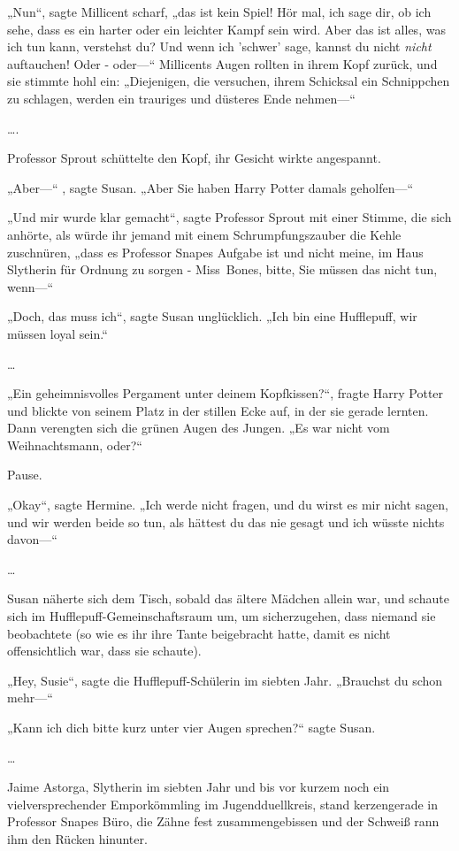 {„Nun“, sagte Millicent scharf, „das ist kein Spiel! Hör mal, ich sage dir, ob ich sehe, dass es ein harter oder ein leichter Kampf sein wird. Aber das ist alles, was ich tun kann, verstehst du? Und wenn ich 'schwer' sage, kannst du nicht \emph{nicht} auftauchen! Oder - oder—“ Millicents Augen rollten in ihrem Kopf zurück, und sie stimmte hohl ein: „Diejenigen, die versuchen, ihrem Schicksal ein Schnippchen zu schlagen, werden ein trauriges und düsteres Ende nehmen—“

….

Professor Sprout schüttelte den Kopf, ihr Gesicht wirkte angespannt.

„Aber—“ , sagte Susan. „Aber Sie haben Harry Potter damals geholfen—“

„Und mir wurde klar gemacht“, sagte Professor Sprout mit einer Stimme, die sich anhörte, als würde ihr jemand mit einem Schrumpfungszauber die Kehle zuschnüren, „dass es Professor Snapes Aufgabe ist und nicht meine, im Haus Slytherin für Ordnung zu sorgen - Miss~Bones, bitte, Sie müssen das nicht tun, wenn—“

„Doch, das muss ich“, sagte Susan unglücklich. „Ich bin eine Hufflepuff, wir müssen loyal sein.“

…

„Ein geheimnisvolles Pergament unter deinem Kopfkissen?“, fragte Harry Potter und blickte von seinem Platz in der stillen Ecke auf, in der sie gerade lernten. Dann verengten sich die grünen Augen des Jungen. „Es war nicht vom Weihnachtsmann, oder?“

Pause.

„Okay“, sagte Hermine. „Ich werde nicht fragen, und du wirst es mir nicht sagen, und wir werden beide so tun, als hättest du das nie gesagt und ich wüsste nichts davon—“

…

Susan näherte sich dem Tisch, sobald das ältere Mädchen allein war, und schaute sich im Hufflepuff-Gemeinschaftsraum um, um sicherzugehen, dass niemand sie beobachtete (so wie es ihr ihre Tante beigebracht hatte, damit es nicht offensichtlich war, dass sie schaute).

„Hey, Susie“, sagte die Hufflepuff-Schülerin im siebten Jahr. „Brauchst du schon mehr—“

„Kann ich dich bitte kurz unter vier Augen sprechen?“ sagte Susan.

…

Jaime Astorga, Slytherin im siebten Jahr und bis vor kurzem noch ein vielversprechender Emporkömmling im Jugendduellkreis, stand kerzengerade in Professor Snapes Büro, die Zähne fest zusammengebissen und der Schweiß rann ihm den Rücken hinunter.

}
